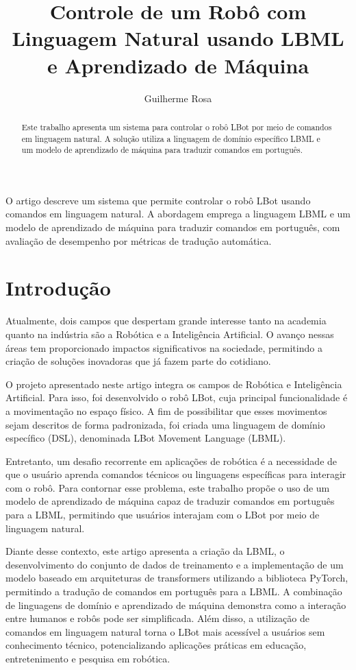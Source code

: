 \documentclass[12pt]{article}
\title{Controle de um Robô com Linguagem Natural usando LBML e Aprendizado de Máquina}
\author{Guilherme Rosa\inst{1} }
\begin{document}
\maketitle

\begin{abstract}
Este trabalho apresenta um sistema para controlar o robô LBot por meio de comandos em linguagem natural. A solução utiliza a linguagem de domínio específico LBML e um modelo de aprendizado de máquina para traduzir comandos em português.
\end{abstract}

\begin{resumo}
O artigo descreve um sistema que permite controlar o robô LBot usando comandos em linguagem natural. A abordagem emprega a linguagem LBML e um modelo de aprendizado de máquina para traduzir comandos em português, com avaliação de desempenho por métricas de tradução automática.
\end{resumo}

\section{Introdução}
Atualmente, dois campos que despertam grande interesse tanto na academia quanto na indústria são a Robótica e a Inteligência Artificial. O avanço nessas áreas tem proporcionado impactos significativos na sociedade, permitindo a criação de soluções inovadoras que já fazem parte do cotidiano.

O projeto apresentado neste artigo integra os campos de Robótica e Inteligência Artificial. Para isso, foi desenvolvido o robô LBot, cuja principal funcionalidade é a movimentação no espaço físico. A fim de possibilitar que esses movimentos sejam descritos de forma padronizada, foi criada uma linguagem de domínio específico (DSL), denominada LBot Movement Language (LBML).

Entretanto, um desafio recorrente em aplicações de robótica é a necessidade de que o usuário aprenda comandos técnicos ou linguagens específicas para interagir com o robô. Para contornar esse problema, este trabalho propõe o uso de um modelo de aprendizado de máquina capaz de traduzir comandos em português para a LBML, permitindo que usuários interajam com o LBot por meio de linguagem natural.

Diante desse contexto, este artigo apresenta a criação da LBML, o desenvolvimento do conjunto de dados de treinamento e a implementação de um modelo baseado em arquiteturas de transformers utilizando a biblioteca PyTorch, permitindo a tradução de comandos em português para a LBML. A combinação de linguagens de domínio e aprendizado de máquina demonstra como a interação entre humanos e robôs pode ser simplificada. Além disso, a utilização de comandos em linguagem natural torna o LBot mais acessível a usuários sem conhecimento técnico, potencializando aplicações práticas em educação, entretenimento e pesquisa em robótica.
\end{document}
